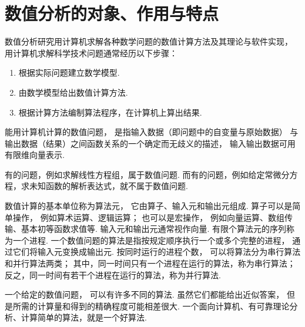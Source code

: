 \section{数值分析的对象、作用与特点}
数值分析研究用计算机求解各种数学问题的数值计算方法及其理论与软件实现，
用计算机求解科学技术问题通常经历以下步骤：
\begin{enumerate}
	\item 根据实际问题建立数学模型.
	\item 由数学模型给出数值计算方法.
	\item 根据计算方法编制算法程序，在计算机上算出结果.
\end{enumerate}

能用计算机计算的数值问题，
是指输入数据（即问题中的自变量与原始数据）
与输出数据（结果）之间函数关系的一个确定而无歧义的描述，
输入输出数据可用有限维向量表示.

有的问题，例如求解线性方程组，属于数值问题.
而有的问题，例如给定常微分方程，求未知函数的解析表达式，就不属于数值问题.

数值计算的基本单位称为算法元，
它由算子、输入元和输出元组成.
算子可以是简单操作，
例如算术运算、逻辑运算；
也可以是宏操作，
例如向量运算、数组传输、基本初等函数求值等.
输入元和输出元通常视作向量.
有限个算法元的序列称为一个进程.
一个数值问题的算法是指按规定顺序执行一个或多个完整的进程，
通过它们将输入元变换成输出元.
按同时运行的进程个数，
可以将算法分为串行算法和并行算法两类；
其中，同一时间只有一个进程在运行的算法，称为串行算法；
反之，同一时间有若干个进程在运行的算法，称为并行算法.

一个给定的数值问题，
可以有许多不同的算法.
虽然它们都能给出近似答案，
但是所需的计算量和得到的精确程度可能相差很大.
一个面向计算机、有可靠理论分析、计算简单的算法，就是一个好算法.
